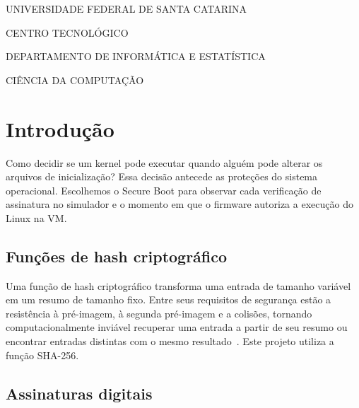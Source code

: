\documentclass[12pt,a4paper,oneside,openany,brazil,chapter=TITLE,section=TITLE]{abntex2}
\begin{document}
\renewcommand{\bibname}{Referências Bibliográficas}
\pretextual
\begin{capa}
  \begin{center}
    UNIVERSIDADE FEDERAL DE SANTA CATARINA\par
    CENTRO TECNOLÓGICO\par
    DEPARTAMENTO DE INFORMÁTICA E ESTATÍSTICA\par
    CIÊNCIA DA COMPUTAÇÃO\par
    \vspace*{4cm}
    \imprimirautor\par
    \vspace*{5cm}
    \textbf{\imprimirtitulo}\par
    \vfill
    \imprimirlocal\par
    \imprimirdata\par
    \vspace*{1cm}
  \end{center}
\end{capa}
\setcounter{page}{1}
\textual
\pagestyle{relatorio}

\chapter{Introdução}

Como decidir se um kernel pode executar quando alguém pode alterar os arquivos
de inicialização? Essa decisão antecede as proteções do sistema operacional.
Escolhemos o Secure Boot para observar cada verificação de assinatura no
simulador e o momento em que o firmware autoriza a execução do Linux na VM.

\section{Funções de hash criptográfico}

Uma função de hash criptográfico transforma uma entrada de tamanho variável em um
resumo de tamanho fixo. Entre seus requisitos de segurança estão a resistência à
pré-imagem, à segunda pré-imagem e a colisões, tornando computacionalmente inviável
recuperar uma entrada a partir de seu resumo ou encontrar entradas distintas com o
mesmo resultado~\cite{stallings,stinson}. Este projeto utiliza a
função SHA-256.

\section{Assinaturas digitais}
\end{document}
